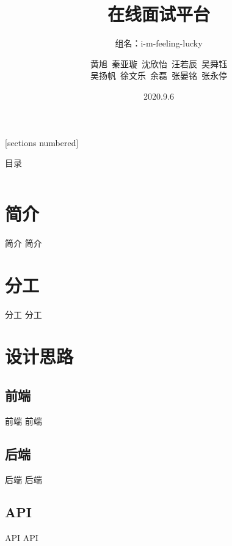 \documentclass[aspectratio=169,10pt]{beamer}
\title{\huge 在线面试平台}
\subtitle{\small 组名：i-m-feeling-lucky}
\author{黄旭\, 秦亚璇\, 沈欣怡\, 汪若辰\, 吴舜钰\\
吴扬帆\, 徐文乐\, 余磊\, 张晏铭\, 张永停}
\date{2020.9.6}
\begin{document}
\maketitle

[sections numbered]

\begin{frame}{目录}
  \renewcommand{\baselinestretch}{1.75}\normalsize
  \begin{columns}[t]
    \begin{column}{.3\textwidth}
      \tableofcontents[sections={-3}]
    \end{column}
    \begin{column}{.5\textwidth}
      \tableofcontents[sections={4-}]
    \end{column}
  \end{columns}
  \renewcommand{\baselinestretch}{1.0}\normalsize
\end{frame}

\section{简介}
\begin{frame}{简介}
  简介
\end{frame}

\section{分工}
\begin{frame}{分工}
  分工
\end{frame}

\section{设计思路}
\subsection{前端}
\begin{frame}{前端}
  前端
\end{frame}
\subsection{后端}
\begin{frame}{后端}
  后端
\end{frame}

\subsection{API}
\begin{frame}{API}
  API
\end{frame}
\end{document}
